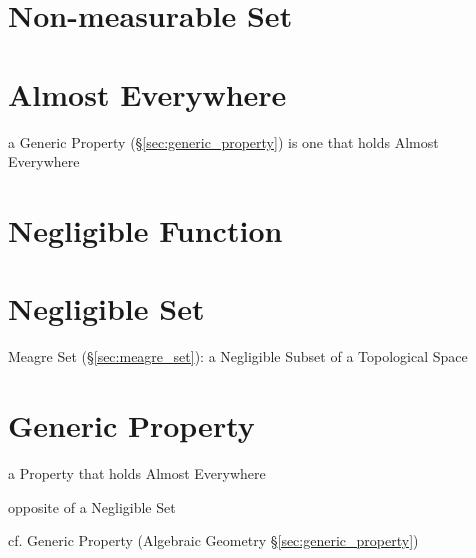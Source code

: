 \section{Non-measurable Set}\label{sec:nonmeasurable_set}

\section{Almost Everywhere}\label{sec:almost_everywhere}

a Generic Property (\S\ref{sec:generic_property}) is one that holds Almost
Everywhere



\section{Negligible Function}\label{sec:negligible_function}

\section{Negligible Set}\label{sec:negligible_set}

Meagre Set (\S\ref{sec:meagre_set}): a Negligible Subset of a Topological Space



\section{Generic Property}\label{sec:generic_measure_property}

a Property that holds Almost Everywhere

opposite of a Negligible Set

cf. Generic Property (Algebraic Geometry \S\ref{sec:generic_property})



